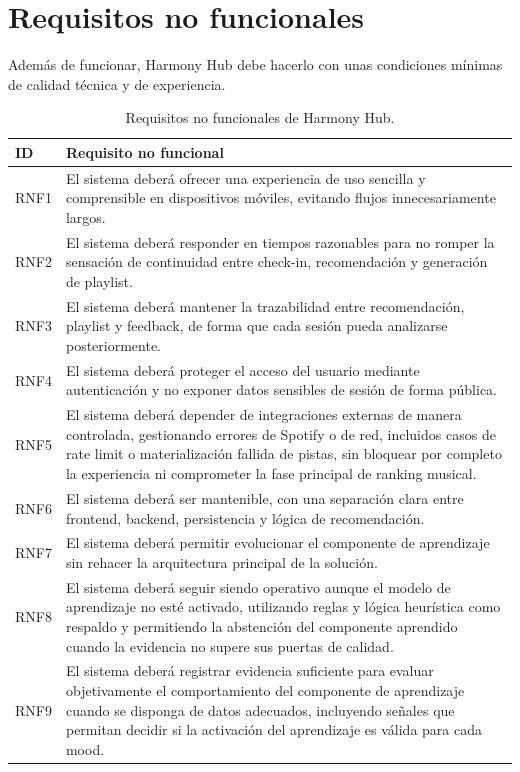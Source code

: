 \section{Requisitos no funcionales}
\label{sec:requisitos_no_funcionales}

Además de funcionar, Harmony Hub debe hacerlo con unas condiciones mínimas de calidad técnica y de experiencia.

\begin{table}[H]
\centering
\small
\renewcommand{\arraystretch}{1.1}
\begin{tabularx}{\textwidth}{|P{1.7cm}|Y|}
\hline
\textbf{ID} & \textbf{Requisito no funcional} \\
\hline
RNF1 & El sistema deberá ofrecer una experiencia de uso sencilla y comprensible en dispositivos móviles, evitando flujos innecesariamente largos. \\
\hline
RNF2 & El sistema deberá responder en tiempos razonables para no romper la sensación de continuidad entre check-in, recomendación y generación de playlist. \\
\hline
RNF3 & El sistema deberá mantener la trazabilidad entre recomendación, playlist y feedback, de forma que cada sesión pueda analizarse posteriormente. \\
\hline
RNF4 & El sistema deberá proteger el acceso del usuario mediante autenticación y no exponer datos sensibles de sesión de forma pública. \\
\hline
RNF5 & El sistema deberá depender de integraciones externas de manera controlada, gestionando errores de Spotify o de red, incluidos casos de rate limit o materialización fallida de pistas, sin bloquear por completo la experiencia ni comprometer la fase principal de ranking musical. \\
\hline
RNF6 & El sistema deberá ser mantenible, con una separación clara entre frontend, backend, persistencia y lógica de recomendación. \\
\hline
RNF7 & El sistema deberá permitir evolucionar el componente de aprendizaje sin rehacer la arquitectura principal de la solución. \\
\hline
RNF8 & El sistema deberá seguir siendo operativo aunque el modelo de aprendizaje no esté activado, utilizando reglas y lógica heurística como respaldo y permitiendo la abstención del componente aprendido cuando la evidencia no supere sus puertas de calidad. \\
\hline
RNF9 & El sistema deberá registrar evidencia suficiente para evaluar objetivamente el comportamiento del componente de aprendizaje cuando se disponga de datos adecuados, incluyendo señales que permitan decidir si la activación del aprendizaje es válida para cada mood. \\
\hline
\end{tabularx}
\caption{Requisitos no funcionales de Harmony Hub.}
\label{tab:requisitos_no_funcionales}
\end{table}

